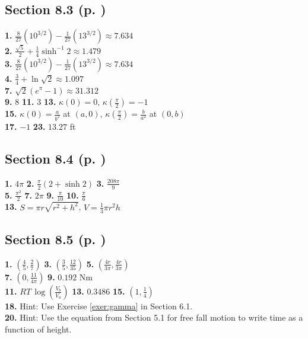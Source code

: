 \begin{multicols*}{2}
\subsection*{Section 8.3 (p. \pageref{sec8dot3})}
\textbf{1.} $\frac{8}{27} (10^{3/2}) - \frac{1}{27} (13^{3/2}) \approx 7.634$\\
\textbf{2.} $\frac{\sqrt{5}}{2} + \frac{1}{4} \sinh^{-1} 2 \approx 1.479$\\
\textbf{3.} $\frac{8}{27} (10^{3/2}) - \frac{1}{27} (13^{3/2}) \approx 7.634$\\
\textbf{4.} $\frac{3}{4} + \ln \sqrt{2} \approx 1.097$\\
\textbf{7.} $\sqrt{2} (e^{\pi}-1) \approx 31.312$\\
\textbf{9.} $8$ \quad
\textbf{11.} $3$ \quad
\textbf{13.} $\kappa(0)=0$, $\kappa(\frac{\pi}{2})=-1$\\
\textbf{15.} $\kappa(0)=\frac{a}{b^2}$ at $(a,0)$, $\kappa(\frac{\pi}{2})=\frac{b}{a^2}$ at $(0,b)$\\
\textbf{17.} $-1$ \quad
\textbf{23.} $13.27$ ft
\subsection*{Section 8.4 (p. \pageref{sec8dot4})}
\textbf{1.} $4\pi$ \quad
\textbf{2.} $\frac{\pi}{2}(2 + \sinh 2)$ \quad
\textbf{3.} $\frac{208\pi}{9}$\\
\textbf{5.} $\frac{\pi^2}{2}$ \quad
\textbf{7.} $2\pi$ \quad
\textbf{9.} $\frac{\pi}{10}$ \quad
\textbf{10.} $\frac{\pi}{6}$\\
\textbf{13.} $S=\pi r\sqrt{r^2+h^2}$, $V=\frac{1}{3}\pi r^2h$
\subsection*{Section 8.5 (p. \pageref{sec8dot5})}
\textbf{1.} $\left(\frac{4}{5},\frac{2}{7}\right)$ \quad
\textbf{3.} $\left(\frac{3}{5},\frac{12}{35}\right)$ \quad
\textbf{5.} $\left(\frac{4r}{3\pi},\frac{4r}{3\pi}\right)$\\
\textbf{7.} $\left(0,\frac{11}{4\pi}\right)$ \quad
\textbf{9.} $0.192$ Nm\\
\textbf{11.} $RT\,\log\left(\frac{V_b}{V_a}\right)$ \quad
\textbf{13.} $0.3486$ \quad
\textbf{15.} $\left(1,\frac{1}{4}\right)$\\
\textbf{18.} Hint: Use Exercise \ref{exer:gamma} in Section 6.1.\\
\textbf{20.} Hint: Use the equation from Section 5.1 for free fall motion to
write time as a function of height.

\end{multicols*}
